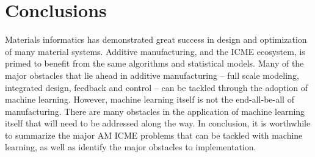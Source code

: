 \section{Conclusions}
Materials informatics has demonstrated great success in design and optimization of many material systems. Additive manufacturing, and the ICME ecosystem, is primed to benefit from the same algorithms and statistical models. Many of the major obstacles that lie ahead in additive manufacturing -- full scale modeling, integrated design, feedback and control -- can be tackled through the adoption of machine learning. However, machine learning itself is not the end-all-be-all of manufacturing. There are many obstacles in the application of machine learning itself that will need to be addressed along the way. In conclusion, it is worthwhile to summarize the major AM ICME problems that can be tackled with machine learning, as well as identify the major obstacles to implementation.


